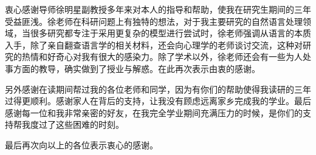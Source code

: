 \begin{acknowledgement}

衷心感谢导师徐明星副教授多年来对本人的指导和帮助，使我在研究生期间的三年受益匪浅。徐老师在科研问题上有独特的想法，对于我主要研究的自然语言处理领域，当很多研究都专注于采用更复杂的模型进行尝试时，徐老师强调从语言的本质入手，除了亲自翻查语言学的相关材料，还会向心理学的老师谈讨交流，这种对研究的热情和好奇心对我有很大的感染力。除了学术以外，徐老师还会有一些为人处事方面的教导，确实做到了授业与解惑。在此再次表示由衷的感谢。

另外感谢在读期间帮过我的各位老师和同学，因为有你们的帮助使得我读研的三年过得更顺利。感谢家人在背后的支持，让我没有顾虑远离家乡完成我的学业。最后感谢每一位和我非常亲密的好友，在我完全学业期间充满压力的时候，是你们的支持帮我度过了这些困难的时刻。

最后再次向以上的各位表示衷心的感谢。


\end{acknowledgement}

